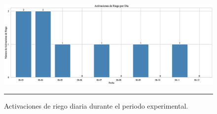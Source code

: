 \documentclass[pdflatex,sn-mathphys-num]{sn-jnl}%
\theoremstyle{thmstyleone}%
\theoremstyle{thmstyletwo}%
\theoremstyle{thmstylethree}%
\begin{document}
\begin{figure}[H]
    \centering
    \includegraphics[width=1\textwidth]{assets/activaciones_riego_diarias.eps}
    \caption{Activaciones de riego diaria durante el periodo experimental.}
    \label{fig:activaciones_riego_diarias}

    \vspace{0.4cm}

    \noindent
    \begin{minipage}[t]{0.45\textwidth}
        \justifying
	\end{minipage}%
    \hfill
    \begin{minipage}[t]{0.45\textwidth}
        \justifying

\end{minipage}

    \vspace{0.5cm}
    \hrule
\end{figure}
\end{document}
